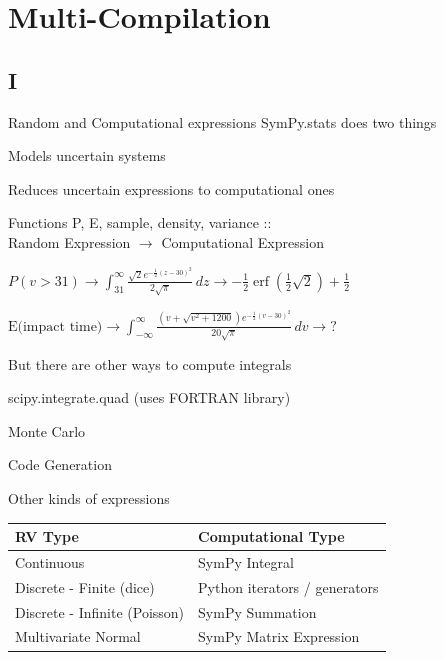 \documentclass[compress, blue]{beamer}
\begin{document}
\section{Multi-Compilation}
\subsection{I}

\begin{frame}[semiverbatim]{Random and Computational expressions}
    SymPy.stats does two things
    \begin{enumerate*}
        \item Models uncertain systems
        \item Reduces uncertain expressions to computational ones
    \end{enumerate*}
    Functions P, E, sample, density, variance ::\\ \indent Random Expression $\rightarrow$ Computational Expression

    $P(v > 31) 
    \rightarrow 
    \int_{31}^{\infty} \frac{\sqrt{2} e^{- \frac{1}{2} \left( z - 30\right)^{2}}} {2 \sqrt{\pi}}\, dz
    \rightarrow
    - \frac{1}{2} \operatorname{erf}{\left (\frac{1}{2} \sqrt{2} \right )} + \frac{1}{2}$

    $\textrm{E(impact time)}
    \rightarrow
    \int_{-\infty}^{\infty} \frac{\left(v + \sqrt{v^{2} + 1200}\right) e^{-
    \frac{1}{2} \left(v -30\right)^{2}}}{20 \sqrt{\pi}}\, dv
    \rightarrow
    ?$

    {
        But there are other ways to compute integrals
        \begin{enumerate*}
            \item scipy.integrate.quad (uses FORTRAN library)
            \item Monte Carlo 
            \item Code Generation
        \end{enumerate*}
    }
\end{frame}

\begin{frame}{Other kinds of expressions}
    \begin{table}
        \begin{tabular}{| l | l |}
           \hline
           RV Type                      &  Computational Type  \\
           \hline\hline
           Continuous                   &   SymPy Integral     \\
           \hline
           Discrete - Finite (dice)     &   Python iterators / generators \\ 
           \hline
           Discrete - Infinite (Poisson)&  SymPy Summation              \\
           \hline
           Multivariate Normal          &   SymPy Matrix Expression      \\
           \hline
       \end{tabular}
   \end{table}
\end{frame}
\end{document}
